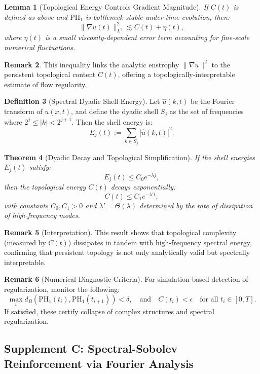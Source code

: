 \documentclass[11pt]{article}
\newtheorem{theorem}{Theorem}[section]
\newtheorem{lemma}[theorem]{Lemma}
\theoremstyle{definition}
\newtheorem{definition}[theorem]{Definition}
\newtheorem{remark}[theorem]{Remark}
\begin{document}
\begin{lemma}[Topological Energy Controls Gradient Magnitude]
If $C(t)$ is defined as above and $\mathrm{PH}_1$ is bottleneck stable under time evolution, then:
\[
\|\nabla u(t)\|_{L^2}^2 \lesssim C(t) + \eta(t),
\]
where $\eta(t)$ is a small viscosity-dependent error term accounting for fine-scale numerical fluctuations.
\end{lemma}

\begin{remark}
This inequality links the analytic enstrophy $\|\nabla u\|^2$ to the persistent topological content $C(t)$, offering a topologically-interpretable estimate of flow regularity.
\end{remark}

\begin{definition}[Spectral Dyadic Shell Energy]
Let $\hat{u}(k,t)$ be the Fourier transform of $u(x,t)$, and define the dyadic shell $S_j$ as the set of frequencies where $2^j \leq |k| < 2^{j+1}$. Then the shell energy is:
\[
E_j(t) := \sum_{k \in S_j} |\hat{u}(k,t)|^2.
\]
\end{definition}

\begin{theorem}[Dyadic Decay and Topological Simplification]
If the shell energies $E_j(t)$ satisfy:
\[
E_j(t) \leq C_0 e^{-\lambda j},
\]
then the topological energy $C(t)$ decays exponentially:
\[
C(t) \leq C_1 e^{-\lambda' t},
\]
with constants $C_0, C_1 > 0$ and $\lambda' = \Theta(\lambda)$ determined by the rate of dissipation of high-frequency modes.
\end{theorem}

\begin{remark}[Interpretation]
This result shows that topological complexity (measured by $C(t)$) dissipates in tandem with high-frequency spectral energy, confirming that persistent topology is not only analytically valid but spectrally interpretable.
\end{remark}

\begin{remark}[Numerical Diagnostic Criteria]
For simulation-based detection of regularization, monitor the following:
\[
\max_i d_B(\mathrm{PH}_1(t_i), \mathrm{PH}_1(t_{i+1})) < \delta, \quad \text{and} \quad C(t_i) < \epsilon \quad \text{for all } t_i \in [0,T].
\]
If satisfied, these certify collapse of complex structures and spectral regularization.
\end{remark}

\subsection*{Supplement C: Spectral-Sobolev Reinforcement via Fourier Analysis}
\end{document}
